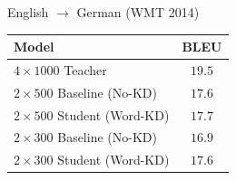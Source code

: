\documentclass{beamer}
\let\tempone\itemize
\let\temptwo\enditemize
\renewenvironment{itemize}{\tempone\addtolength{\itemsep}{0.5\baselineskip}}{\temptwo}
\newcommand{\air}{\vspace{0.25cm}}
\begin{document}



\begin{frame}
\centerline{}
\air
\air
\center English $\rightarrow$ German (WMT 2014)
\begin{table}
\centering
\small
\begin{tabular}{lc}
\toprule
Model &  BLEU   \\
\midrule
$4 \times 1000$  Teacher    &  $19.5$ \\
\midrule
$2 \times 500$ Baseline (No-KD)  $\,$   &  $17.6$   \\
$2 \times 500$ Student (Word-KD)  & $17.7$   \\
\midrule 
$2 \times 300$  Baseline (No-KD)  $\,$   &  $16.9$  \\
$2 \times 300$  Student (Word-KD)  &  $17.6$  \\
\bottomrule
\end{tabular}
\end{table}
\end{frame}

\end{document}
